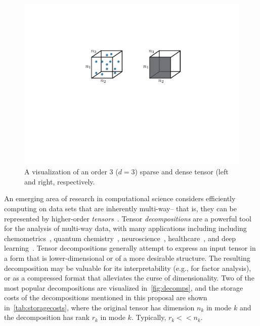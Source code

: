 \begin{figure}
  \centering 
  \includegraphics[width=0.6\linewidth]{thpropfigs/sparseanddense}
  \caption{A visualization of an order 3 ($d=3$) sparse and dense tensor (left and right, respectively.}
  \label{fig:sparseanddense}
\end{figure}
An emerging area of research in computational science considers efficiently computing on data sets that are 
inherently multi-way-- that is, they can be represented by higher-order \emph{tensors}~\cite{Acar09futuredirections,Kolda:2009}. 
%
%
Tensor \emph{decompositions} are a powerful tool for the analysis of multi-way data, with many applications including including chemometrics~\cite{chemometrics}, quantum chemistry~\cite{quantumsurvey}, neuroscience~\cite{eegsurvey}, healthcare~\cite{rubik}, and deep learning~\cite{ttnn}. Tensor decompositions generally attempt to express an input tensor in a form that is lower-dimensional or of a more desirable structure. The resulting decomposition may be valuable for its interpretability (e.g., for factor analysis), or as a compressed format that alleviates the curse of dimensionality. Two of the most popular decompositions are visualized in~\cref{fig:decomps}, and the storage costs of the decompositions mentioned in this proposal are shown in~\cref{tab:storagecosts}, where the original tensor has dimension $n_k$ in mode $k$ and the decomposition has rank $r_k$ in mode $k$. Typically, $r_k << n_k$.

